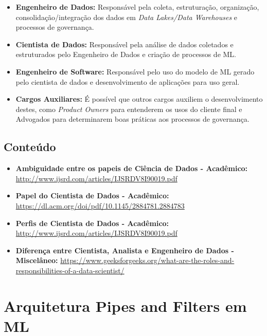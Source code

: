 \documentclass[portugues, 12pt, a4paper]{article}
\begin{document}
\begin{itemize}
\item \textbf{Engenheiro de Dados:} Responsável pela coleta, estruturação, organização, consolidação/integração dos dados em \textit{Data Lakes/Data Warehouses} e processos de governança.

\item \textbf{Cientista de Dados:} Responsável pela análise de dados coletados e estruturados pelo Engenheiro de Dados e criação de processos de ML.

\item \textbf{Engenheiro de Software:} Responsável pelo uso do modelo de ML gerado pelo cientista de dados e desenvolvimento de aplicações para uso geral.

\item \textbf{Cargos Auxiliares:} É possível que outros cargos auxiliem o desenvolvimento destes, como \textit{Product Owners} para entenderem os usos do cliente final e Advogados para determinarem boas práticas aos processos de governança.

\end{itemize}

\subsection{Conteúdo}

\begin{itemize}
\item \textbf{Ambiguidade entre os papeis de Ciência de Dados - Acadêmico:} \url{http://www.ijsrd.com/articles/IJSRDV8I90019.pdf}

\item \textbf{Papel do Cientista de Dados - Acadêmico:} \url{https://dl.acm.org/doi/pdf/10.1145/2884781.2884783}

\item \textbf{Perfis de Cientista de Dados - Acadêmico:} \url{http://www.ijsrd.com/articles/IJSRDV8I90019.pdf}

\item \textbf{Diferença entre Cientista, Analista e Engenheiro de Dados - Miscelâneo:} \url{https://www.geeksforgeeks.org/what-are-the-roles-and-responsibilities-of-a-data-scientist/}
\end{itemize}

\section{Arquitetura Pipes and Filters em ML}
\end{document}
